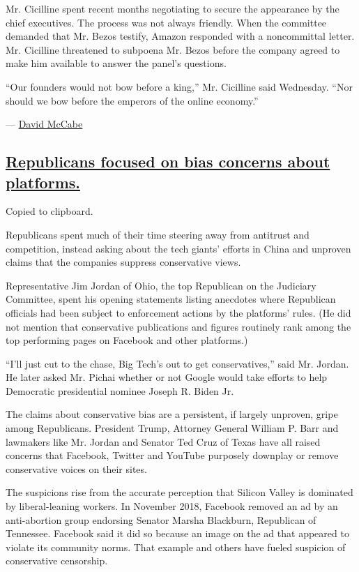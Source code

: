 Mr. Cicilline spent recent months negotiating to secure the appearance
by the chief executives. The process was not always friendly. When the
committee demanded that Mr. Bezos testify, Amazon responded with a
noncommittal letter. Mr. Cicilline threatened to subpoena Mr. Bezos
before the company agreed to make him available to answer the panel's
questions.

``Our founders would not bow before a king,'' Mr. Cicilline said
Wednesday. ``Nor should we bow before the emperors of the online
economy.''

--- \href{https://www.nytimes.com/by/david-mccabe}{David McCabe}

\hypertarget{republicans-focused-on-bias-concerns-about-platforms}{%
\subsection{\texorpdfstring{\protect\hyperlink{republicans-focused-on-bias-concerns-about-platforms}{Republicans
focused on bias concerns about
platforms.}}{Republicans focused on bias concerns about platforms.}}\label{republicans-focused-on-bias-concerns-about-platforms}}

Copied to clipboard.

Republicans spent much of their time steering away from antitrust and
competition, instead asking about the tech giants' efforts in China and
unproven claims that the companies suppress conservative views.

Representative Jim Jordan of Ohio, the top Republican on the Judiciary
Committee, spent his opening statements listing anecdotes where
Republican officials had been subject to enforcement actions by the
platforms' rules. (He did not mention that conservative publications and
figures routinely rank among the top performing pages on Facebook and
other platforms.)

``I'll just cut to the chase, Big Tech's out to get conservatives,''
said Mr. Jordan. He later asked Mr. Pichai whether or not Google would
take efforts to help Democratic presidential nominee Joseph R. Biden Jr.

The claims about conservative bias are a persistent, if largely
unproven, gripe among Republicans. President Trump, Attorney General
William P. Barr and lawmakers like Mr. Jordan and Senator Ted Cruz of
Texas have all raised concerns that Facebook, Twitter and YouTube
purposely downplay or remove conservative voices on their sites.

The suspicions rise from the accurate perception that Silicon Valley is
dominated by liberal-leaning workers. In November 2018, Facebook removed
an ad by an anti-abortion group endorsing Senator Marsha Blackburn,
Republican of Tennessee. Facebook said it did so because an image on the
ad that appeared to violate its community norms. That example and others
have fueled suspicion of conservative censorship.

